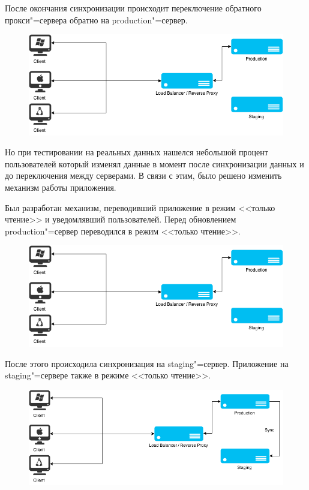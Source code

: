 \documentclass[10pt, a5paper]{article}
\begin{document}
После окончания синхронизации происходит переключение обратного прокси"=сервера обратно на production"=сервер.

\begin{figure}[h!]
  \centering
  \includegraphics[scale=0.36]{02_2015_07_working_on_prod}
\end{figure}

Но при тестировании на реальных данных нашелся небольшой процент пользователей который изменял данные в момент после синхронизации данных и до переключения между серверами.
В связи с этим, было решено изменить механизм работы приложения.

Был разработан механизм, переводивший приложение в режим <<только чтение>> и уведомлявший пользователей. Перед обновлением production"=сервер переводился в режим <<только чтение>>.

\begin{figure}[h!]
  \centering
  \includegraphics[scale=0.36]{02_2015_08_working}
\end{figure}

После этого происходила синхронизация на staging"=сервер. Приложение на staging"=сервере также в режиме <<только чтение>>.

\begin{figure}[h!]
  \centering
  \includegraphics[scale=0.36]{02_2015_09_sync_to_stage}
\end{figure}
\end{document}
